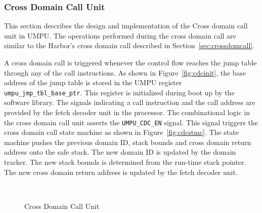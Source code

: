 \subsubsection{Cross Domain Call Unit}
\label{sec:cdcunit}
%
This section describes the design and implementation of the Cross domain call unit in UMPU.
%
The operations performed during the cross domain call are similar to the Harbor's cross domain call described in Section~\ref{sec:crossdomcall}.
%

A cross domain call is triggered whenever the control flow reaches the jump table through any of the call instructions.
%
As shown in Figure~\ref{fig:cdcinit}, the base address of the jump
table is stored in the UMPU register
\texttt{umpu\_jmp\_tbl\_base\_ptr}.
%
This register is initialized during boot up by the software library.
%
The signals indicating a call instruction and the call address are
provided by the fetch decoder unit in the processor.
%
The combinational logic in the cross domain call unit asserts the \texttt{UMPU\_CDC\_EN} signal.
%
This signal triggers the cross domain call state machine as shown in Figure~\ref{fig:cdcstmc}.
%
The state machine pushes the previous domain ID, stack bounds and cross domain return address onto the safe stack.
%
The new domain ID is updated by the domain tracker.
%
The new stack bounds is determined from the run-time stack pointer.
%
The new cross domain return address is updated by the fetch decoder unit.
%
\begin{figure}[htpb]
 \centering
  \mbox{
    \hspace{0.2in}
  }
  \caption{Cross Domain Call Unit}
\end{figure}   

